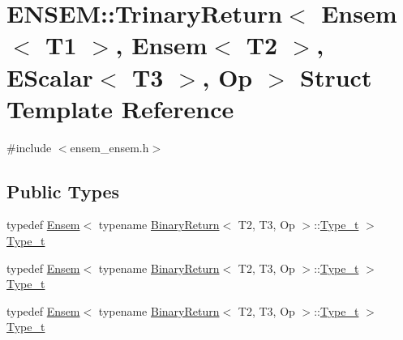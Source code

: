\hypertarget{structENSEM_1_1TrinaryReturn_3_01Ensem_3_01T1_01_4_00_01Ensem_3_01T2_01_4_00_01EScalar_3_01T3_01_4_00_01Op_01_4}{}\section{E\+N\+S\+EM\+:\+:Trinary\+Return$<$ Ensem$<$ T1 $>$, Ensem$<$ T2 $>$, E\+Scalar$<$ T3 $>$, Op $>$ Struct Template Reference}
\label{structENSEM_1_1TrinaryReturn_3_01Ensem_3_01T1_01_4_00_01Ensem_3_01T2_01_4_00_01EScalar_3_01T3_01_4_00_01Op_01_4}


{\ttfamily \#include $<$ensem\+\_\+ensem.\+h$>$}

\subsection*{Public Types}
\begin{DoxyCompactItemize}
\item 
typedef \mbox{\hyperlink{classENSEM_1_1Ensem}{Ensem}}$<$ typename \mbox{\hyperlink{structENSEM_1_1BinaryReturn}{Binary\+Return}}$<$ T2, T3, Op $>$\+::\mbox{\hyperlink{structENSEM_1_1TrinaryReturn_3_01Ensem_3_01T1_01_4_00_01Ensem_3_01T2_01_4_00_01EScalar_3_01T3_01_4_00_01Op_01_4_a68a0b36114073ec8f6b91656624821c7}{Type\+\_\+t}} $>$ \mbox{\hyperlink{structENSEM_1_1TrinaryReturn_3_01Ensem_3_01T1_01_4_00_01Ensem_3_01T2_01_4_00_01EScalar_3_01T3_01_4_00_01Op_01_4_a68a0b36114073ec8f6b91656624821c7}{Type\+\_\+t}}
\item 
typedef \mbox{\hyperlink{classENSEM_1_1Ensem}{Ensem}}$<$ typename \mbox{\hyperlink{structENSEM_1_1BinaryReturn}{Binary\+Return}}$<$ T2, T3, Op $>$\+::\mbox{\hyperlink{structENSEM_1_1TrinaryReturn_3_01Ensem_3_01T1_01_4_00_01Ensem_3_01T2_01_4_00_01EScalar_3_01T3_01_4_00_01Op_01_4_a68a0b36114073ec8f6b91656624821c7}{Type\+\_\+t}} $>$ \mbox{\hyperlink{structENSEM_1_1TrinaryReturn_3_01Ensem_3_01T1_01_4_00_01Ensem_3_01T2_01_4_00_01EScalar_3_01T3_01_4_00_01Op_01_4_a68a0b36114073ec8f6b91656624821c7}{Type\+\_\+t}}
\item 
typedef \mbox{\hyperlink{classENSEM_1_1Ensem}{Ensem}}$<$ typename \mbox{\hyperlink{structENSEM_1_1BinaryReturn}{Binary\+Return}}$<$ T2, T3, Op $>$\+::\mbox{\hyperlink{structENSEM_1_1TrinaryReturn_3_01Ensem_3_01T1_01_4_00_01Ensem_3_01T2_01_4_00_01EScalar_3_01T3_01_4_00_01Op_01_4_a68a0b36114073ec8f6b91656624821c7}{Type\+\_\+t}} $>$ \mbox{\hyperlink{structENSEM_1_1TrinaryReturn_3_01Ensem_3_01T1_01_4_00_01Ensem_3_01T2_01_4_00_01EScalar_3_01T3_01_4_00_01Op_01_4_a68a0b36114073ec8f6b91656624821c7}{Type\+\_\+t}}
\end{DoxyCompactItemize}


